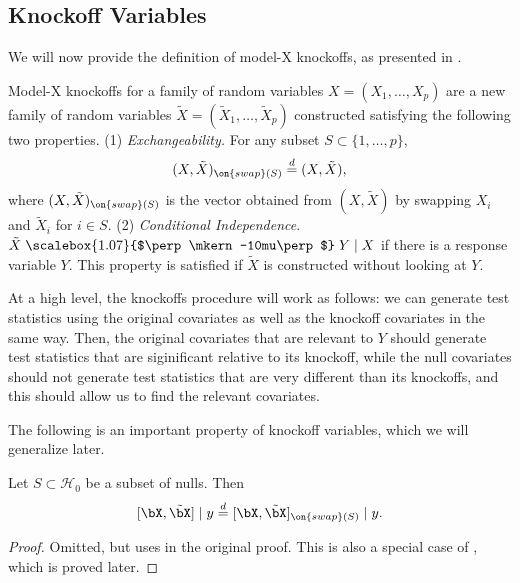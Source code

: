 \documentclass[11pt,reqno]{report}
\theoremstyle{definition}
\newcommand{\indep}{\mathrel{\text{\scalebox{1.07}{$\perp\mkern-10mu\perp$}}}}
\numberwithin{equation}{section}
\begin{document}
\subsection{Knockoff Variables}
We will now provide the definition of model-X knockoffs, as presented in \cite{panning}.
\begin{defn}
\label{knockdef}
Model-X knockoffs for a family of random variables $X = (X_1, \ldots, X_p)$ are a new family of random variables $\tilde{X} = (\tilde{X}_1, \ldots, \tilde{X}_p)$ constructed satisfying the following two properties.
 (1) \emph{Exchangeability.} For any subset $S \subset \{ 1, \ldots, p \}$, 
\begin{equation}
(X, \tilde{X})_{\on{swap}(S)} \overset{d}{=} (X, \tilde{X}),
\end{equation}
where $(X, \tilde{X})_{\on{swap}(S)}$ is the vector obtained from $(X, \tilde{X})$ by swapping $X_i$ and $\tilde{X}_i$ for $i \in S$. (2) \emph{Conditional Independence}. $\tilde{X} \indep Y \mid X$ if there is a response variable $Y$. This property is satisfied if $\tilde{X}$ is constructed without looking at $Y$.
\end{defn}
At a high level, the knockoffs procedure will work as follows: we can generate test statistics using the original covariates as well as the knockoff covariates in the same way. Then, the original covariates that are relevant to $Y$ should generate test statistics that are siginificant relative to its knockoff, while the null covariates should not generate test statistics that are very different than its knockoffs, and this should allow us to find the relevant covariates.

The following is an important property of knockoff variables, which we will generalize later.
\begin{lem}
\label{origexchangeofnulls}
Let $S \subset \mathcal{H}_0$ be a subset of nulls. Then
\[ [\bX, \tilde{\bX} ] \mid y \overset{d}{=} [\bX, \tilde{\bX} ]_{\on{swap}(S)} \mid y. \]
\end{lem}
\begin{proof}
Omitted, but uses  in the original proof. This is also a special case of , which is proved later.
\end{proof}
\end{document}
